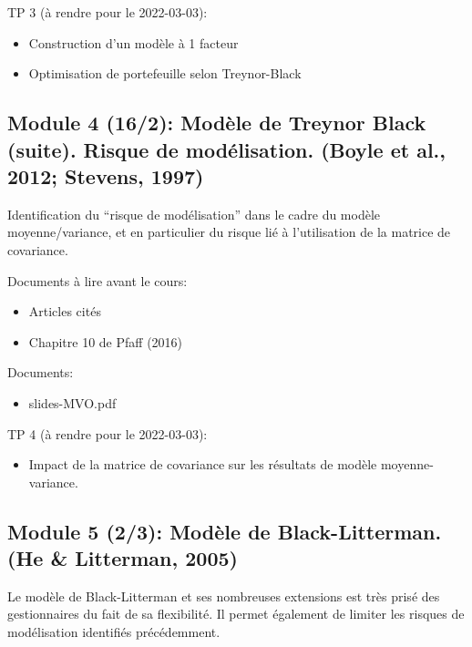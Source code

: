 \documentclass[
  11pt,
]{article}
\providecommand{\tightlist}{%
  \setlength{\itemsep}{0pt}\setlength{\parskip}{0pt}}
\begin{document}
TP 3 (à rendre pour le 2022-03-03):

\begin{itemize}
\tightlist
\item
  Construction d'un modèle à 1 facteur
\item
  Optimisation de portefeuille selon Treynor-Black
\end{itemize}

\hypertarget{module-4-162-moduxe8le-de-treynor-black-suite.-risque-de-moduxe9lisation.-boyle2012-ste1997}{%
\subsection{Module 4 (16/2): Modèle de Treynor Black (suite). Risque de
modélisation. (Boyle et al., 2012; Stevens,
1997)}\label{module-4-162-moduxe8le-de-treynor-black-suite.-risque-de-moduxe9lisation.-boyle2012-ste1997}}

Identification du ``risque de modélisation'' dans le cadre du modèle
moyenne/variance, et en particulier du risque lié à l'utilisation de la
matrice de covariance.

Documents à lire avant le cours:

\begin{itemize}
\tightlist
\item
  Articles cités
\item
  Chapitre 10 de Pfaff (2016)
\end{itemize}

Documents:

\begin{itemize}
\tightlist
\item
  slides-MVO.pdf
\end{itemize}

TP 4 (à rendre pour le 2022-03-03):

\begin{itemize}
\tightlist
\item
  Impact de la matrice de covariance sur les résultats de modèle
  moyenne-variance.
\end{itemize}

\hypertarget{module-5-23-moduxe8le-de-black-litterman.-he2005}{%
\subsection{Module 5 (2/3): Modèle de Black-Litterman. (He \& Litterman,
2005)}\label{module-5-23-moduxe8le-de-black-litterman.-he2005}}

Le modèle de Black-Litterman et ses nombreuses extensions est très prisé
des gestionnaires du fait de sa flexibilité. Il permet également de
limiter les risques de modélisation identifiés précédemment.
\end{document}
